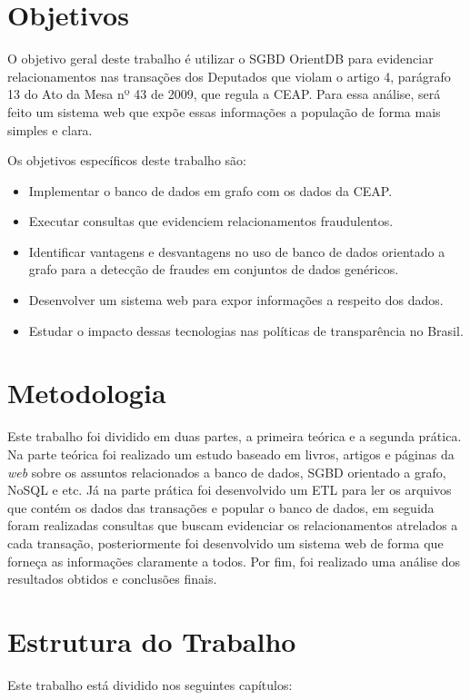 \section{Objetivos}
	O objetivo geral deste trabalho é utilizar o SGBD OrientDB para evidenciar relacionamentos nas transações dos Deputados que violam o artigo 4, parágrafo 13 do Ato da Mesa nº 43 de 2009, que regula a CEAP. Para essa análise, será feito um sistema web que expõe essas informações a população de forma mais simples e clara.
	
	Os objetivos específicos deste trabalho são:
	\begin{itemize}
		\item Implementar o banco de dados em grafo com os dados da CEAP.
		\item Executar consultas que evidenciem relacionamentos fraudulentos.
		\item Identificar vantagens e desvantagens no uso de banco de dados orientado a grafo para a detecção de fraudes em conjuntos de dados genéricos.
		\item Desenvolver um sistema web para expor informações a respeito dos dados.
		\item Estudar o impacto dessas tecnologias nas políticas de transparência no Brasil.
	\end{itemize}

\section{Metodologia}

	Este trabalho foi dividido em duas partes, a primeira teórica e a segunda prática. Na parte teórica foi realizado um estudo baseado em livros, artigos e páginas da \textit{web} sobre os assuntos relacionados a banco de dados, SGBD orientado a grafo, NoSQL e etc. Já na parte prática foi desenvolvido um ETL para ler os arquivos que contém os dados das transações e popular o banco de dados, em seguida foram realizadas consultas que buscam evidenciar os relacionamentos atrelados a cada transação, posteriormente foi desenvolvido um sistema web de forma que forneça as informações claramente a todos. Por fim, foi realizado uma análise dos resultados obtidos e conclusões finais.

\section{Estrutura do Trabalho}
	Este trabalho está dividido nos seguintes capítulos:
	
